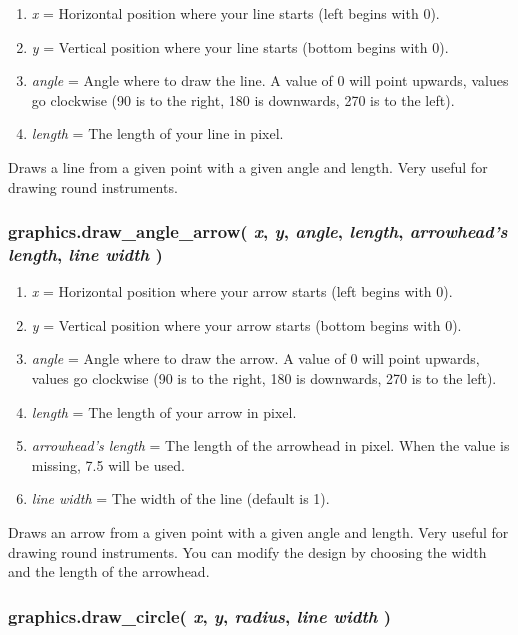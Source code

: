 \documentclass[11pt,parskip=half,a4paper]{scrartcl}
\begin{document}
\begin{enumerate}
	\item \emph{x} = Horizontal position where your line starts (left begins with 0).
	\item \emph{y} = Vertical position where your line starts (bottom begins with 0).
	\item \emph{angle} = Angle where to draw the line. A value of 0 will point upwards, values go clockwise (90 is to the right, 180 is downwards, 270 is to the left).
	\item \emph{length} = The length of your line in pixel.

\end{enumerate}

Draws a line from a given point with a given angle and length. Very useful for drawing round instruments.

\subsubsection{graphics.draw\_angle\_arrow( \emph{x}, \emph{y}, \emph{angle}, \emph{length}, \emph{arrowhead's length}, \emph{line width} )}

\begin{enumerate}
	\item \emph{x} = Horizontal position where your arrow starts (left begins with 0).
	\item \emph{y} = Vertical position where your arrow starts (bottom begins with 0).
	\item \emph{angle} = Angle where to draw the arrow. A value of 0 will point upwards, values go clockwise (90 is to the right, 180 is downwards, 270 is to the left).
	\item \emph{length} = The length of your arrow in pixel.
	\item \emph{arrowhead's length} = The length of the arrowhead in pixel. When the value is missing, 7.5 will be used.
	\item \emph{line width} = The width of the line (default is 1).
\end{enumerate}

Draws an arrow from a given point with a given angle and length. Very useful for drawing round instruments. You can modify the design by choosing the width and the length of the arrowhead.

\subsubsection{graphics.draw\_circle( \emph{x}, \emph{y}, \emph{radius}, \emph{line width} )}
\end{document}
